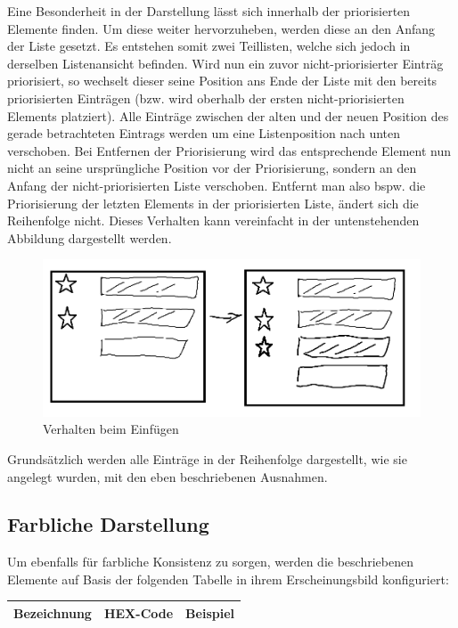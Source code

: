 \begin{itemize}
Eine Besonderheit in der Darstellung lässt sich innerhalb der priorisierten Elemente finden. Um diese weiter hervorzuheben, werden diese an den Anfang der Liste gesetzt. Es entstehen somit zwei Teillisten, welche sich jedoch in derselben Listenansicht befinden. Wird nun ein zuvor nicht-priorisierter Einträg priorisiert, so wechselt dieser seine Position ans Ende der Liste mit den bereits priorisierten Einträgen (bzw. wird oberhalb der ersten nicht-priorisierten Elements platziert). Alle Einträge zwischen der alten und der neuen Position des gerade betrachteten Eintrags werden um eine Listenposition nach unten verschoben. Bei Entfernen der Priorisierung wird das entsprechende Element nun nicht an seine ursprüngliche Position vor der Priorisierung, sondern an den Anfang der nicht-priorisierten Liste verschoben. Entfernt man also bspw. die Priorisierung der letzten Elements in der priorisierten Liste, ändert sich die Reihenfolge nicht. Dieses Verhalten kann vereinfacht in der untenstehenden Abbildung dargestellt werden.

\begin{figure}[h!]
	\includegraphics[width=\linewidth]{img/sketch_insert.png}
	\centering
	\caption{Verhalten beim Einfügen}
	\label{fig:inserttodo}
\end{figure}

Grundsätzlich werden alle Einträge in der Reihenfolge dargestellt, wie sie angelegt wurden, mit den eben beschriebenen Ausnahmen.


\subsection{Farbliche Darstellung}
Um ebenfalls für farbliche Konsistenz zu sorgen, werden die beschriebenen Elemente auf Basis der folgenden Tabelle in ihrem Erscheinungsbild konfiguriert:

\begin{table}[h!]
	\centering
	\begin{tabular}{ |c|c|c|}
		\hline
		\textbf{Bezeichnung} & \textbf{HEX-Code} & \textbf{Beispiel}\\
		\hline
		

\end{tabular}
\end{table}
\end{itemize}
